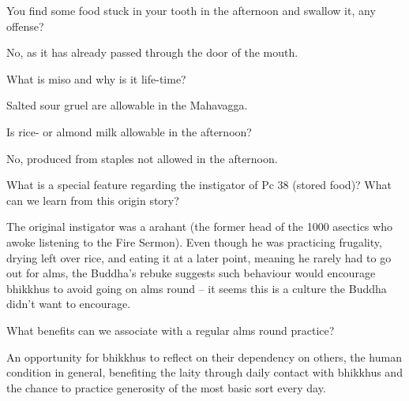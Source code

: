 \bigskip

You find some food stuck in your tooth in the afternoon and swallow it, any offense?

\begin{solution}
  No, as it has already passed through the door of the mouth.
\end{solution}

\bigskip

What is miso and why is it life-time?

\begin{solution}
  Salted sour gruel are allowable in the Mahavagga.
\end{solution}

\bigskip

Is rice- or almond milk allowable in the afternoon?

\begin{solution}
  No, produced from staples not allowed in the afternoon.
\end{solution}

\bigskip


What is a special feature regarding the instigator of Pc 38 (stored food)? What
can we learn from this origin story?

\begin{solution}
  The original instigator was a arahant (the former head of the 1000 asectics
  who awoke listening to the Fire Sermon). Even though he was practicing
  frugality, drying left over rice, and eating it at a later point, meaning he
  rarely had to go out for alms, the Buddha’s rebuke suggests such behaviour
  would encourage bhikkhus to avoid going on alms round – it seems this is a
  culture the Buddha didn’t want to encourage.
\end{solution}

\bigskip

What benefits can we associate with a regular alms round practice?

\begin{solution}
  An opportunity for bhikkhus to reflect on their dependency on others, the
  human condition in general, benefiting the laity through daily contact with
  bhikkhus and the chance to practice generosity of the most basic sort every
  day.
\end{solution}

